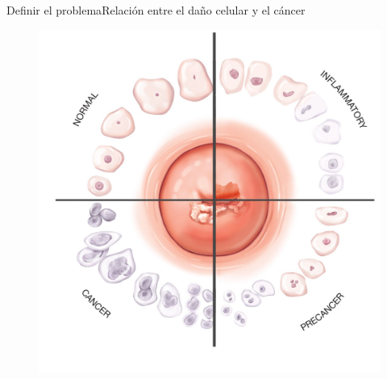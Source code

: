 \documentclass{beamer}
\begin{document}
    \begin{frame}{Definir el problema}{Relación entre el daño celular y el cáncer}
        \begin{figure}[]
            \centering
            \includegraphics[height=1\textheight]{ciclo.jpg}
        \end{figure}
    \end{frame}
\end{document}
